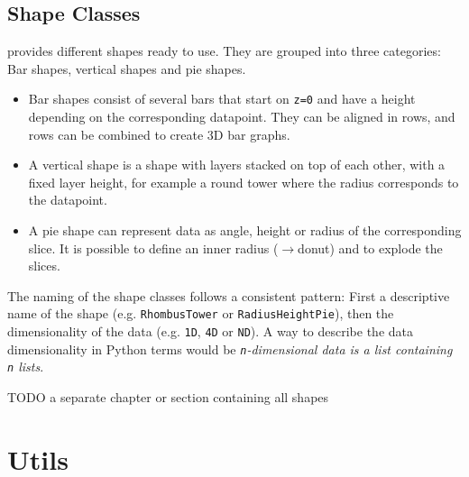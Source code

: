 \subsection{Shape Classes}

\tangible{} provides different shapes ready to use. They are grouped into three
categories: Bar shapes, vertical shapes and  pie shapes.

\begin{itemize}
	\item Bar shapes consist of several bars that start on \texttt{z=0} and have a
		height depending on the corresponding datapoint. They can be aligned in
		rows, and rows can be combined to create 3D bar graphs.
	\item A vertical shape is a shape with layers stacked on top of each other,
		with a fixed layer height, for example a round tower where the radius
		corresponds to the datapoint.
	\item A pie shape can represent data as angle, height or radius of the
		corresponding slice. It is possible to define an inner radius ($\rightarrow$donut) and
		to explode the slices.
\end{itemize}

\noindent The naming of the shape classes follows a consistent pattern: First a
descriptive name of the shape (e.g. \texttt{RhombusTower} or
\texttt{RadiusHeightPie}), then the dimensionality of the data (e.g.
\texttt{1D}, \texttt{4D} or \texttt{ND}). A way to describe the data
dimensionality in Python terms would be \emph{\texttt{n}-dimensional data is a
list containing \texttt{n} lists}.

TODO a separate chapter or section containing all shapes


\section{Utils}\label{sec:utils}
